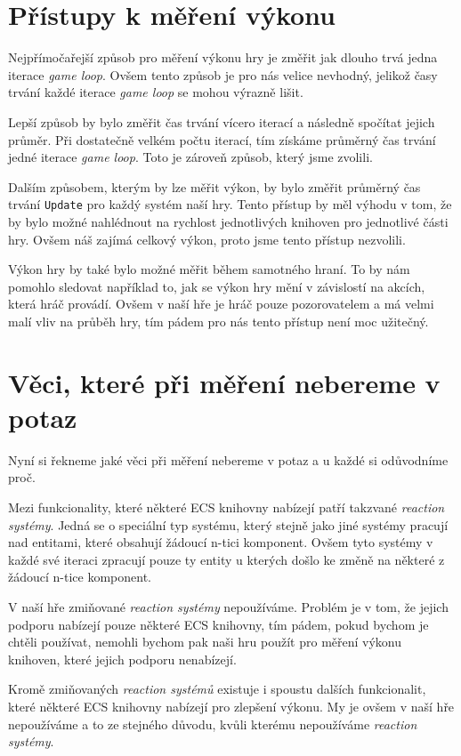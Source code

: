 \section{Přístupy k měření výkonu}
\label{sec:performance-measurements}
Nejpřímočařejší způsob pro měření výkonu hry je změřit jak dlouho trvá jedna iterace \textit{game loop}. Ovšem tento způsob je pro nás velice nevhodný, jelikož časy trvání každé iterace \textit{game loop} se mohou výrazně lišit.

Lepší způsob by bylo změřit čas trvání vícero iterací a následně spočítat jejich průměr. Při dostatečně velkém počtu iterací, tím získáme průměrný čas trvání jedné iterace \textit{game loop}. Toto je zároveň způsob, který jsme zvolili.

Dalším způsobem, kterým by lze měřit výkon, by bylo změřit průměrný čas trvání \texttt{Update} pro každý systém naší hry. Tento přístup by měl výhodu v tom, že by bylo možné nahlédnout na rychlost jednotlivých knihoven pro jednotlivé části hry. Ovšem náš zajímá celkový výkon, proto jsme tento přístup nezvolili.

Výkon hry by také bylo možné měřit během samotného hraní. To by nám pomohlo sledovat například to, jak se výkon hry mění v závislostí na akcích, která hráč provádí. Ovšem v naší hře je hráč pouze pozorovatelem a má velmi malí vliv na průběh hry, tím pádem pro nás tento přístup není moc užitečný.

\section{Věci, které při měření nebereme v potaz}
Nyní si řekneme jaké věci při měření nebereme v potaz a u každé si odůvodníme proč.

Mezi funkcionality, které některé ECS knihovny nabízejí patří takzvané \textit{reaction systémy}. Jedná se o speciální typ systému, který stejně jako jiné systémy pracují nad entitami, které obsahují žádoucí n-tici komponent. Ovšem tyto systémy v každé své iteraci zpracují pouze ty entity u kterých došlo ke změně na některé z žádoucí n-tice komponent.

V naší hře zmiňované \textit{reaction systémy} nepoužíváme. Problém je v tom, že jejich podporu nabízejí pouze některé ECS knihovny, tím pádem, pokud bychom je chtěli používat, nemohli bychom pak naši hru použít pro měření výkonu knihoven, které jejich podporu nenabízejí.

Kromě zmiňovaných \textit{reaction systémů} existuje i spoustu dalších funkcionalit, které některé ECS knihovny nabízejí pro zlepšení výkonu. My je ovšem v naší hře nepoužíváme a to ze stejného důvodu, kvůli kterému nepoužíváme \textit{reaction systémy}.















